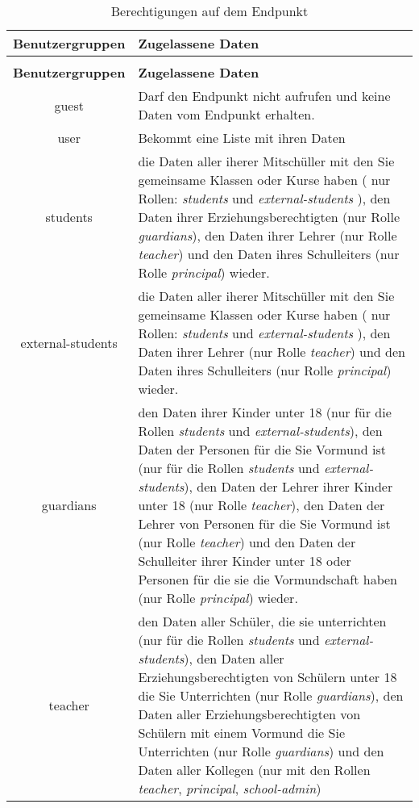 \begin{longtable}{|c|p{}|}
\caption{Berechtigungen auf dem Endpunkt}
\label{tab:end:rest:api:school:users:get:right} \\
\hline
\textbf{Benutzergruppen} & \textbf{Zugelassene Daten} \\ \hline
\endfirsthead
\caption{Berechtigungen auf dem Endpunkt}\\
\hline
\textbf{Benutzergruppen} & \textbf{Zugelassene Daten} \\ \hline
\endhead
guest & Darf den Endpunkt nicht aufrufen und keine Daten vom Endpunkt erhalten. \\ \hline
user & Bekommt eine Liste mit ihren Daten \\ \hline 
students & die Daten aller iherer Mitschüller mit den Sie gemeinsame Klassen oder Kurse haben ( nur Rollen: \textit{students} und \textit{external-students} ),
           den Daten ihrer Erziehungsberechtigten (nur Rolle \textit{guardians}), 
					 den Daten ihrer Lehrer (nur Rolle \textit{teacher}) und 
					 den Daten ihres Schulleiters (nur Rolle \textit{principal}) wieder.\\ \hline
external-students &  die Daten aller iherer Mitschüller mit den Sie gemeinsame Klassen oder Kurse haben ( nur Rollen: \textit{students} und \textit{external-students} ),
           den Daten ihrer Lehrer (nur Rolle \textit{teacher}) und 
					 den Daten ihres Schulleiters (nur Rolle \textit{principal}) wieder.\\ \hline
guardians & den Daten ihrer Kinder unter 18 (nur für die Rollen \textit{students} und \textit{external-students}), 
					den Daten der Personen für die Sie Vormund ist (nur für die Rollen \textit{students} und \textit{external-students}), 
					den Daten der Lehrer ihrer Kinder unter 18 (nur Rolle \textit{teacher}),
					den Daten der Lehrer von Personen für die Sie Vormund ist (nur Rolle \textit{teacher})	und
					den Daten der Schulleiter ihrer Kinder unter 18 oder Personen für die sie die Vormundschaft haben (nur Rolle \textit{principal})
					wieder.\\ \hline
teacher & den Daten aller Schüler, die sie unterrichten (nur für die Rollen \textit{students} und \textit{external-students}),
					den Daten aller Erziehungsberechtigten von Schülern unter 18 die Sie Unterrichten (nur Rolle \textit{guardians}),
					den Daten aller Erziehungsberechtigten von Schülern mit einem Vormund die Sie Unterrichten (nur Rolle \textit{guardians}) und
					den Daten aller Kollegen (nur mit den Rollen \textit{teacher}, \textit{principal}, \textit{school-admin}) 

\end{longtable}
